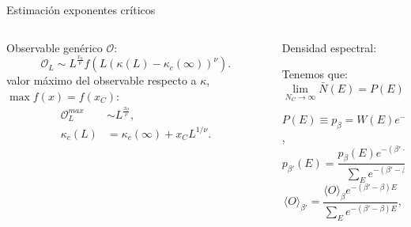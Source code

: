 \documentclass[xcolor=dvipsnames]{beamer}
\begin{document}
\begin{frame}{Estimación exponentes críticos}
\begin{columns}
  \begin{column}{5.8cm}
    Observable genérico $\mathcal{O}$:
    \begin{equation*}
      \mathcal{O}_L\sim L^{\frac{x_0}{\nu}}f(L (\kappa(L)-\kappa_c(\infty))^{\nu}).
    \end{equation*}
  valor máximo del observable respecto a $\kappa$, $\max f(x)=f(x_C)$:
  \begin{align*}
    \mathcal{O}^{max}_L& \sim L^{\frac{x_0}{\nu}},\\
    \kappa_c(L)&=\kappa_c(\infty)+x_CL^{1/\nu}.
  \end{align*}
  \end{column}
  \begin{column}{5.8cm}
    {\color{fblue} Densidad espectral:}

    Tenemos que:
    \begin{equation*}
      \lim _{N_C\rightarrow \infty}\bar{N}(E)=P(E)
    \end{equation*}

    $P(E)\equiv p_{\beta}=W(E)e^{-\beta E+f}$,
    \begin{equation*}
      p_{\beta'}(E)=\frac{p_{\beta}(E)e^{-(\beta'-\beta)E}}{\sum_E e^{-(\beta'-\beta)E}},
    \end{equation*}
    \centering
    \begin{equation*}
      \langle O\rangle_{\beta'}=\frac{\langle
        O\rangle_{\beta} e^{-(\beta'-\beta)E}}{\sum_E e^{-(\beta'-\beta)E}},
    \end{equation*}
  \end{column}
\end{columns}
\end{frame}
\end{document}
